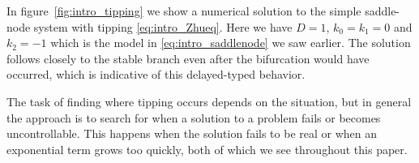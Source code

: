 In figure~\ref{fig:intro_tipping} we show a numerical solution to the simple saddle-node system with tipping \eqref{eq:intro_Zhueq}. Here we have $D=1$, $k_0=k_1=0$ and $k_2=-1$ which is the model in \eqref{eq:intro_saddlenode} we saw earlier. The solution follows closely to the stable branch even after the bifurcation would have occurred, which is indicative of this delayed-typed behavior.


The task of finding where tipping occurs depends on the situation, but in general the approach is to search for when a solution to a problem fails or becomes uncontrollable. This happens when the solution fails to be real or when an exponential term grows too quickly, both of which we see throughout this paper.
